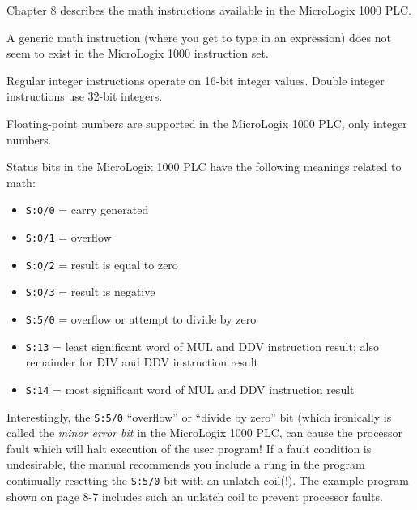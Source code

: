 












Chapter 8 describes the math instructions available in the MicroLogix 1000 PLC.

\vskip 10pt

A generic math instruction (where you get to type in an expression) does not seem to exist in the MicroLogix 1000 instruction set.

\vskip 10pt

Regular integer instructions operate on 16-bit integer values.  Double integer instructions use 32-bit integers.

\vskip 10pt

Floating-point numbers are  supported in the MicroLogix 1000 PLC, only integer numbers.

\vskip 10pt

Status bits in the MicroLogix 1000 PLC have the following meanings related to math:

\begin{itemize}
\item{} {\tt S:0/0} = carry generated
\item{} {\tt S:0/1} = overflow
\item{} {\tt S:0/2} = result is equal to zero 
\item{} {\tt S:0/3} = result is negative
\item{} {\tt S:5/0} = overflow or attempt to divide by zero
\item{} {\tt S:13} = least significant word of MUL and DDV instruction result; also remainder for DIV and DDV instruction result
\item{} {\tt S:14} = most significant word of MUL and DDV instruction result
\end{itemize}

Interestingly, the {\tt S:5/0} ``overflow'' or ``divide by zero'' bit (which ironically is called the {\it minor error bit} in the MicroLogix 1000 PLC, can cause the processor fault which will halt execution of the user program!  If a fault condition is undesirable, the manual recommends you include a rung in the program continually resetting the {\tt S:5/0} bit with an unlatch coil(!).  The example program shown on page 8-7 includes such an unlatch coil to prevent processor faults.






